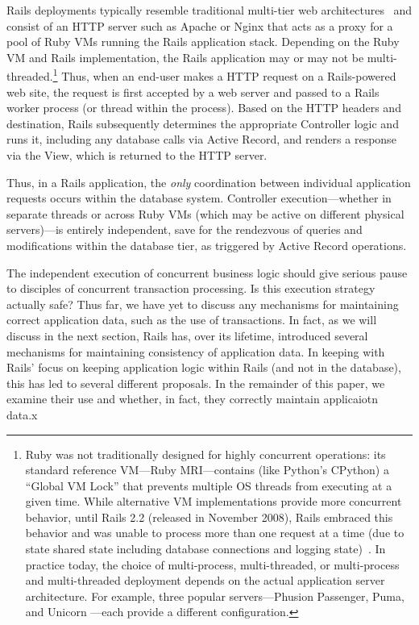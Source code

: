 Rails deployments typically resemble traditional multi-tier web architectures~\cite{alonso-web} and consist of an HTTP server such as Apache or Nginx that acts as a proxy for a pool of Ruby VMs running the Rails application stack. Depending on the Ruby VM and Rails implementation, the Rails application may or may not be multi-threaded.\footnote{Ruby was not traditionally designed for highly concurrent operations: its standard reference VM---Ruby MRI---contains (like Python's CPython) a ``Global VM Lock'' that prevents multiple OS threads from executing at a given time. While alternative VM implementations provide more concurrent behavior, until Rails 2.2 (released in November 2008), Rails embraced this behavior and was unable to process more than one request at a time (due to state shared state including database connections and logging state)~\cite{rails-threading}. In practice today, the choice of multi-process, multi-threaded, or multi-process and multi-threaded deployment depends on the actual application server architecture. For example, three popular servers---Phusion Passenger, Puma, and Unicorn ---each provide a different configuration.} Thus, when an end-user makes a HTTP request on a Rails-powered web site, the request is first accepted by a web server and passed to a Rails worker process (or thread within the process). Based on the HTTP headers and destination, Rails subsequently determines the appropriate Controller logic and runs it, including any database calls via Active Record, and renders a response via the View, which is returned to the HTTP server.

Thus, in a Rails application, the \textit{only} coordination between individual application requests occurs within the database system. Controller execution---whether in separate threads or across Ruby VMs (which may be active on different physical servers)---is entirely independent, save for the rendezvous of queries and modifications within the database tier, as triggered by Active Record operations.

The independent execution of concurrent business logic should give serious pause to disciples of concurrent transaction processing. Is this execution strategy actually safe? Thus far, we have yet to discuss any mechanisms for maintaining correct application data, such as the use of transactions. In fact, as we will discuss in the next section, Rails has, over its lifetime, introduced several mechanisms for maintaining consistency of application data. In keeping with Rails' focus on keeping application logic within Rails (and not in the database), this has led to several different proposals. In the remainder of this paper, we examine their use and whether, in fact, they correctly maintain applicaiotn data.x



